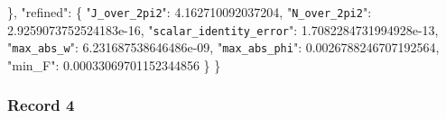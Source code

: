 \documentclass[
  10pt,
]{article}
\newenvironment{Shaded}{}{}
\newcommand{\DataTypeTok}[1]{\textcolor[rgb]{0.56,0.13,0.00}{#1}}
\newcommand{\FloatTok}[1]{\textcolor[rgb]{0.25,0.63,0.44}{#1}}
\newcommand{\FunctionTok}[1]{\textcolor[rgb]{0.02,0.16,0.49}{#1}}
\begin{document}
\begin{Shaded}
\begin{Highlighting}[]
  \FunctionTok{\},}
  \DataTypeTok{"refined"}\FunctionTok{:} \FunctionTok{\{}
    \DataTypeTok{"\nolinkurl{J_over_2pi2}"}\FunctionTok{:} \FloatTok{4.162710092037204}\FunctionTok{,}
    \DataTypeTok{"\nolinkurl{N_over_2pi2}"}\FunctionTok{:} \FloatTok{2.9259073752524183e{-}16}\FunctionTok{,}
    \DataTypeTok{"\nolinkurl{scalar_identity_error}"}\FunctionTok{:} \FloatTok{1.7082284731994928e{-}13}\FunctionTok{,}
    \DataTypeTok{"\nolinkurl{max_abs_w}"}\FunctionTok{:} \FloatTok{6.231687538646486e{-}09}\FunctionTok{,}
    \DataTypeTok{"\nolinkurl{max_abs_phi}"}\FunctionTok{:} \FloatTok{0.0026788246707192564}\FunctionTok{,}
    \DataTypeTok{"min\_F"}\FunctionTok{:} \FloatTok{0.00033069701152344856}
  \FunctionTok{\}}
\FunctionTok{\}}
\end{Highlighting}
\end{Shaded}

\hypertarget{record-4-1}{%
\subsubsection{Record 4}\label{record-4-1}}
\end{document}

